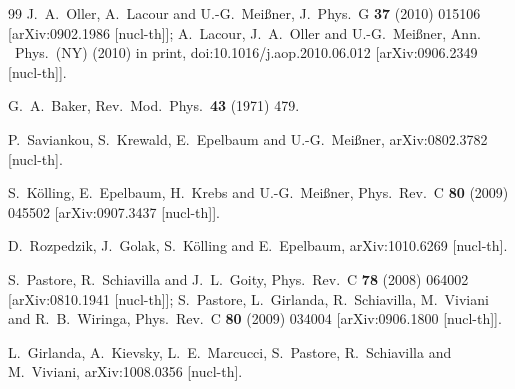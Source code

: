 \documentclass[a4paper,fleqn]{scrartcl}
\begin{document}
{\begin{thebibliography}{99}
  J.~A.~Oller, A.~Lacour and U.-G.~Mei\ss ner,
  J.\ Phys.\ G {\bf 37} (2010) 015106
  [arXiv:0902.1986 [nucl-th]];
 A.~Lacour, J.~A.~Oller and U.-G.~Mei\ss ner,
  Ann. \ Phys.\ (NY) (2010) in print, doi:10.1016/j.aop.2010.06.012
  [arXiv:0906.2349 [nucl-th]].

  G.~A.~Baker,
  Rev.\ Mod.\ Phys.\  {\bf 43} (1971) 479.

  P.~Saviankou, S.~Krewald, E.~Epelbaum and U.-G.~Mei\ss ner,
  arXiv:0802.3782 [nucl-th].

  S.~K\"olling, E.~Epelbaum, H.~Krebs and U.-G.~Mei\ss ner,
  Phys.\ Rev.\  C {\bf 80} (2009) 045502
  [arXiv:0907.3437 [nucl-th]].

  D.~Rozpedzik, J.~Golak, S.~K\"olling and E.~Epelbaum,
  arXiv:1010.6269 [nucl-th].

  S.~Pastore, R.~Schiavilla and J.~L.~Goity,
  Phys.\ Rev.\  C {\bf 78} (2008) 064002
  [arXiv:0810.1941 [nucl-th]];
  S.~Pastore, L.~Girlanda, R.~Schiavilla, M.~Viviani and R.~B.~Wiringa,
  Phys.\ Rev.\  C {\bf 80} (2009) 034004
  [arXiv:0906.1800 [nucl-th]].

  L.~Girlanda, A.~Kievsky, L.~E.~Marcucci, S.~Pastore, R.~Schiavilla and M.~Viviani,
  arXiv:1008.0356 [nucl-th].


\end{thebibliography}}
\end{document}

